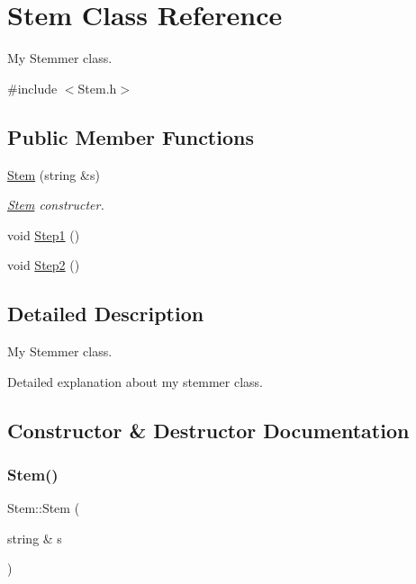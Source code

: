 \hypertarget{class_stem}{}\section{Stem Class Reference}
\label{class_stem}


My Stemmer class.  




{\ttfamily \#include $<$Stem.\+h$>$}

\subsection*{Public Member Functions}
\begin{DoxyCompactItemize}
\item 
\hyperlink{class_stem_a2b8b95a758defb2542da3aee21bd3463}{Stem} (string \&s)
\begin{DoxyCompactList}\small\item\em \hyperlink{class_stem}{Stem} constructer. \end{DoxyCompactList}\item 
void \hyperlink{class_stem_a0664001fe76935498f49932b446d43c3}{Step1} ()
\item 
void \hyperlink{class_stem_a95139a3503d1ce3307635cc714af22b8}{Step2} ()
\end{DoxyCompactItemize}


\subsection{Detailed Description}
My Stemmer class. 

Detailed explanation about my stemmer class. 

\subsection{Constructor \& Destructor Documentation}
\mbox{\label{class_stem_a2b8b95a758defb2542da3aee21bd3463}} 
\subsubsection{\texorpdfstring{Stem()}{Stem()}}
{\footnotesize\ttfamily Stem\+::\+Stem (\begin{DoxyParamCaption}\item[{string \&}]{s }\end{DoxyParamCaption})\hspace{0.3cm}{\ttfamily [inline]}}



